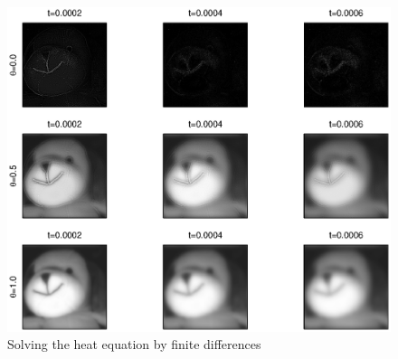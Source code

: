 \begin{exo}
\begin{figure}[ht]
    \begin{center}
    \includegraphics[scale=0.7]{images/eq-chaleur-diff-finie.eps}
    \end{center}
    \caption{Solving the heat equation by finite differences}
              \label{fig-eq-heat-finite-diff}
\end{figure}
\end{exo}
 
